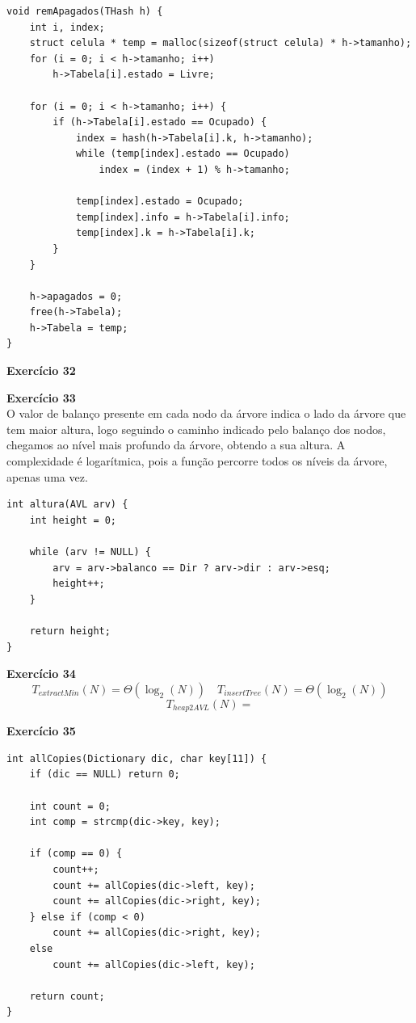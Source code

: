 \documentclass[a4paper,11pt]{article}
\begin{document}
\begin{verbatim}
void remApagados(THash h) {
	int i, index;
	struct celula * temp = malloc(sizeof(struct celula) * h->tamanho);
	for (i = 0; i < h->tamanho; i++)
		h->Tabela[i].estado = Livre;
	
	for (i = 0; i < h->tamanho; i++) {
		if (h->Tabela[i].estado == Ocupado) {
			index = hash(h->Tabela[i].k, h->tamanho);
			while (temp[index].estado == Ocupado)
				index = (index + 1) % h->tamanho;
			
			temp[index].estado = Ocupado;
			temp[index].info = h->Tabela[i].info;
			temp[index].k = h->Tabela[i].k;
		}
	}
	
	h->apagados = 0;
	free(h->Tabela);
	h->Tabela = temp;
}
\end{verbatim}

\noindent \textbf{Exercício 32}



\noindent \textbf{Exercício 33}\\

\noindent O valor de balanço presente em cada nodo da árvore indica o lado da árvore que tem maior altura, logo seguindo o caminho indicado pelo balanço dos nodos, chegamos ao nível mais profundo da árvore, obtendo a sua altura. A complexidade é logarítmica, pois a função percorre todos os níveis da árvore, apenas uma vez.

\begin{verbatim}
int altura(AVL arv) {
	int height = 0;
	
	while (arv != NULL) {
		arv = arv->balanco == Dir ? arv->dir : arv->esq;
		height++;
	}
	
	return height;
}
\end{verbatim}

\noindent \textbf{Exercício 34}
\[
	T_{extractMin}(N) = \Theta(\log_2(N)) \quad T_{insertTree}(N) = \Theta(\log_2(N))
\]
\[
	T_{heap2AVL}(N) = 
\]

\noindent \textbf{Exercício 35}

\begin{verbatim}
int allCopies(Dictionary dic, char key[11]) {
	if (dic == NULL) return 0;
	
	int count = 0;
	int comp = strcmp(dic->key, key);
	
	if (comp == 0) {
		count++;
		count += allCopies(dic->left, key);
		count += allCopies(dic->right, key);
	} else if (comp < 0)
		count += allCopies(dic->right, key);
	else
		count += allCopies(dic->left, key);
	
	return count;
}

\end{verbatim}
\end{document}
